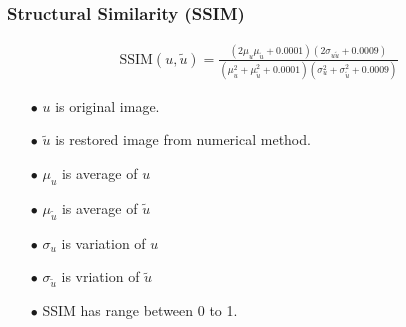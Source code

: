 \documentclass[xcolor=dvipsnames, xetex,serif]{beamer}
\begin{document}
    \begin{frame}
        \frametitle{Structural Similarity (SSIM)}
        \begin{align*}
        \text{SSIM}(u,\tilde{u}) = \frac{(2\mu_u\mu_{\tilde{u}} + 0.0001)(2\sigma_{u\tilde{u}} + 0.0009)}{(\mu_u^2+\mu_{\tilde{u}}^2+0.0001)(\sigma_u^2+\sigma_{\tilde{u}}^2+0.0009)}
        \end{align*}
        \begin{itemize}
            \item[$\bullet$] $u$ is original image.
            \item[$\bullet$] $\tilde{u}$ is restored image from numerical method.
            \item[$\bullet$] $\mu_u$ is average of $u$
            \item[$\bullet$] $\mu_{\tilde{u}}$ is average of $\tilde{u}$
            \item[$\bullet$]  $\sigma_u$ is variation of $u$ 
            \item[$\bullet$] $\sigma_{\tilde{u}}$ is vriation of $\tilde{u}$
            \item[$\bullet$] SSIM has range between 0 to 1.
        \end{itemize}
    \end{frame}
\end{document}

